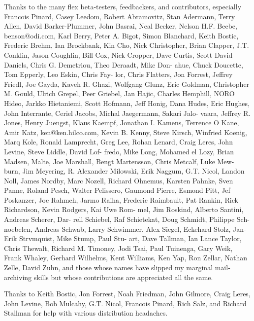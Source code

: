 \documentclass[12pt,spanish,twocolumn,lettersize]{article}
\begin{document}
{       Thanks to the many  flex	 beta-testers,	feedbackers,  and
       contributors,  especially  Francois  Pinard, Casey Leedom,
       Robert  Abramovitz,  Stan  Adermann,  Terry  Allen,  David
       Barker-Plummer,	John  Basrai,  Neal  Becker,  Nelson H.F.
       Beebe, benson@odi.com, Karl Berry, Peter A.  Bigot,  Simon
       Blanchard,  Keith  Bostic,  Frederic Brehm, Ian Brockbank,
       Kin Cho, Nick Christopher, Brian	 Clapper,  J.T.	 Conklin,
       Jason Coughlin, Bill Cox, Nick Cropper, Dave Curtis, Scott
       David Daniels, Chris G. Demetriou, Theo Deraadt, Mike Don-
       ahue,  Chuck  Doucette, Tom Epperly, Leo Eskin, Chris Fay-
       lor, Chris Flatters,  Jon  Forrest,  Jeffrey  Friedl,  Joe
       Gayda,  Kaveh  R.  Ghazi,  Wolfgang  Glunz,  Eric Goldman,
       Christopher M. Gould, Ulrich  Grepel,  Peer  Griebel,  Jan
       Hajic,  Charles	Hemphill,  NORO Hideo, Jarkko Hietaniemi,
       Scott Hofmann, Jeff Honig, Dana Hudes, Eric  Hughes,  John
       Interrante, Ceriel Jacobs, Michal Jaegermann, Sakari Jalo-
       vaara, Jeffrey R.  Jones,  Henry	 Juengst,  Klaus  Kaempf,
       Jonathan	  I.   Kamens,	 Terrence   O  Kane,  Amir  Katz,
       ken@ken.hilco.com, Kevin B. Kenny, Steve Kirsch,	 Winfried
       Koenig,	Marq  Kole,  Ronald  Lamprecht,	 Greg  Lee, Rohan
       Lenard, Craig Leres, John Levine, Steve Liddle, David Lof-
       fredo,  Mike  Long,  Mohamed el Lozy, Brian Madsen, Malte,
       Joe Marshall, Bengt Martensson, Chris Metcalf,  Luke  Mew-
       burn,  Jim  Meyering,  R. Alexander Milowski, Erik Naggum,
       G.T.  Nicol,  Landon  Noll,  James  Nordby,  Marc  Nozell,
       Richard Ohnemus, Karsten Pahnke, Sven Panne, Roland Pesch,
       Walter  Pelissero,  Gaumond  Pierre,  Esmond   Pitt,   Jef
       Poskanzer,  Joe	Rahmeh,	 Jarmo Raiha, Frederic Raimbault,
       Pat Rankin, Rick Richardson, Kevin Rodgers, Kai	Uwe  Rom-
       mel,  Jim  Roskind, Alberto Santini, Andreas Scherer, Dar-
       rell Schiebel, Raf Schietekat, Doug Schmidt, Philippe Sch-
       noebelen,  Andreas  Schwab,  Larry Schwimmer, Alex Siegel,
       Eckehard Stolz, Jan-Erik Strvmquist, Mike Stump, Paul Stu-
       art,  Dave  Tallman,  Ian  Lance	 Taylor,  Chris	 Thewalt,
       Richard M. Timoney, Jodi Tsai, Paul Tuinenga,  Gary  Weik,
       Frank  Whaley,  Gerhard	Wilhelms, Kent Williams, Ken Yap,
       Ron Zellar, Nathan Zelle,  David	 Zuhn,	and  those  whose
       names  have  slipped my marginal mail-archiving skills but
       whose contributions are appreciated all the same.

       Thanks to Keith Bostic, Jon Forrest, Noah  Friedman,  John
       Gilmore,	 Craig	Leres,	John  Levine,  Bob  Mulcahy, G.T.
       Nicol, Francois Pinard, Rich Salz,  and	Richard	 Stallman
       for help with various distribution headaches.

}
\end{document}
